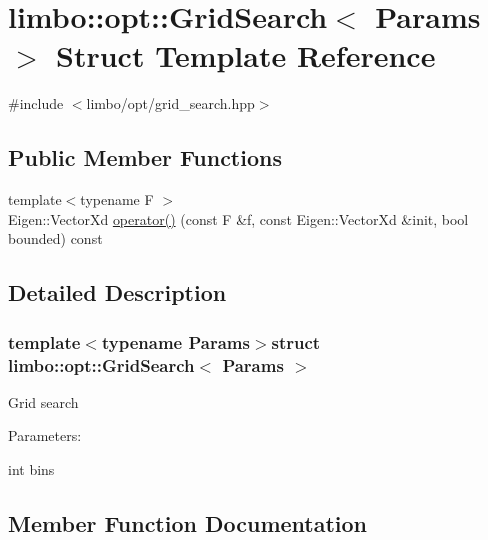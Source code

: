 \hypertarget{structlimbo_1_1opt_1_1_grid_search}{}\section{limbo\+:\+:opt\+:\+:Grid\+Search$<$ Params $>$ Struct Template Reference}
\label{structlimbo_1_1opt_1_1_grid_search}


{\ttfamily \#include $<$limbo/opt/grid\+\_\+search.\+hpp$>$}

\subsection*{Public Member Functions}
\begin{DoxyCompactItemize}
\item 
{\footnotesize template$<$typename F $>$ }\\Eigen\+::\+Vector\+Xd \hyperlink{structlimbo_1_1opt_1_1_grid_search_a33545a99e631d9e35776a7d7a582c8a2}{operator()} (const F \&f, const Eigen\+::\+Vector\+Xd \&init, bool bounded) const 
\end{DoxyCompactItemize}


\subsection{Detailed Description}
\subsubsection*{template$<$typename Params$>$struct limbo\+::opt\+::\+Grid\+Search$<$ Params $>$}

Grid search

Parameters\+:
\begin{DoxyItemize}
\item int bins 
\end{DoxyItemize}

\subsection{Member Function Documentation}
\hypertarget{structlimbo_1_1opt_1_1_grid_search_a33545a99e631d9e35776a7d7a582c8a2}{}

